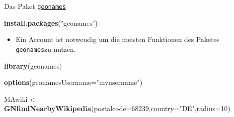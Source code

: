 \documentclass[ignorenonframetext,]{beamer}
\newenvironment{Shaded}{\begin{snugshade}}{\end{snugshade}}
\newcommand{\DataTypeTok}[1]{\textcolor[rgb]{0.13,0.29,0.53}{#1}}
\newcommand{\DecValTok}[1]{\textcolor[rgb]{0.00,0.00,0.81}{#1}}
\newcommand{\KeywordTok}[1]{\textcolor[rgb]{0.13,0.29,0.53}{\textbf{#1}}}
\newcommand{\NormalTok}[1]{#1}
\newcommand{\StringTok}[1]{\textcolor[rgb]{0.31,0.60,0.02}{#1}}
\providecommand{\tightlist}{%
  \setlength{\itemsep}{0pt}\setlength{\parskip}{0pt}}
\begin{document}
\begin{frame}[fragile]{Das Paket
\href{https://github.com/ropensci/geonames}{\texttt{geonames}}}
\protect\hypertarget{das-paket-geonames}{}

\begin{Shaded}
\begin{Highlighting}[]
\KeywordTok{install.packages}\NormalTok{(}\StringTok{"geonames"}\NormalTok{)}
\end{Highlighting}
\end{Shaded}

\begin{itemize}
\tightlist
\item
  Ein Account ist notwendig um die meisten Funktionen des Paketes
  \texttt{geonames}zu nutzen.
\end{itemize}

\begin{Shaded}
\begin{Highlighting}[]
\KeywordTok{library}\NormalTok{(geonames)}
\end{Highlighting}
\end{Shaded}

\begin{Shaded}
\begin{Highlighting}[]
\KeywordTok{options}\NormalTok{(}\DataTypeTok{geonamesUsername=}\StringTok{"myusername"}\NormalTok{)}
\end{Highlighting}
\end{Shaded}

\begin{Shaded}
\begin{Highlighting}[]
\NormalTok{MAwiki <-}\StringTok{ }\KeywordTok{GNfindNearbyWikipedia}\NormalTok{(}\DataTypeTok{postalcode=}\DecValTok{68239}\NormalTok{,}\DataTypeTok{country=}\StringTok{"DE"}\NormalTok{,}\DataTypeTok{radius=}\DecValTok{10}\NormalTok{)}
\end{Highlighting}
\end{Shaded}


\end{frame}
\end{document}
